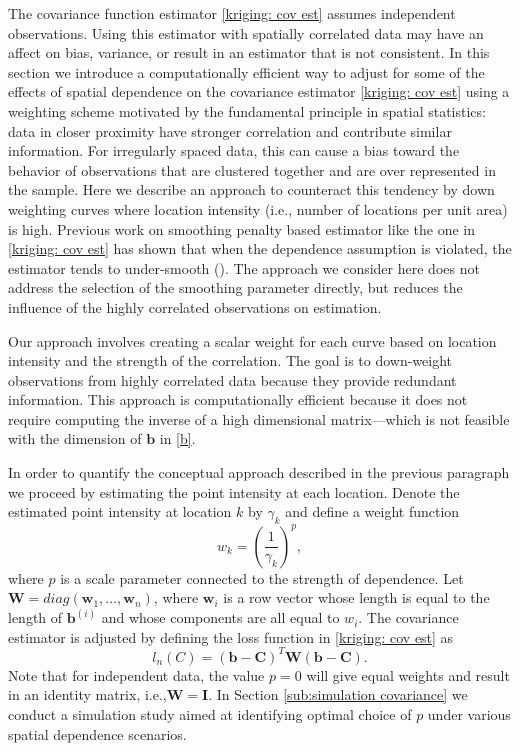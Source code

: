 The covariance function estimator \eqref{kriging: cov est} assumes independent observations. Using this estimator with spatially correlated data may have an affect on bias, variance, or result in an estimator that is not consistent. In this section we introduce a computationally efficient way to adjust for some of the effects of spatial dependence on the covariance estimator \ref{kriging: cov est} using a weighting scheme motivated by the fundamental principle in spatial statistics: data in closer proximity have stronger correlation and contribute similar information. For irregularly spaced data, this can cause a bias toward the behavior of observations that are clustered together and are over represented in the sample. Here we describe an approach to counteract this tendency by down weighting curves where location intensity (i.e., number of locations per unit area) is high. Previous work on smoothing penalty based estimator like the one in \eqref{kriging: cov est} has shown that when the dependence assumption is violated, the estimator tends to under-smooth (\cite{Wang:1998tq}). The approach we consider here does not address the selection of the smoothing parameter directly, but reduces the influence of the highly correlated observations on estimation. 

Our approach involves creating a scalar weight for each curve based on location intensity and the strength of the correlation. The goal is to down-weight observations from highly correlated data because they provide redundant information. This approach is computationally efficient because it does not require computing the inverse of a high dimensional matrix---which is not feasible with the dimension of $\mathbf{b}$ in \eqref{b}.  

In order to quantify the conceptual approach described in the previous paragraph we proceed by estimating the point intensity at each location. Denote the estimated point intensity at location $k$ by $\gamma_k$ and define a weight function 
\begin{equation}
	w_k = \left(\frac{1}{\gamma_k}\right)^p, 
\end{equation}
where $p$ is a scale parameter connected to the strength of dependence.
Let $\mathbf{W}=diag(\mathbf{w}_1, \dots, \mathbf{w}_n)$, where $\mathbf{w}_i$ is a row vector whose length is equal to the length of $\mathbf{b}^{(i)}$ and whose components are all equal to $w_i$. The covariance estimator is adjusted by defining the loss function in \eqref{kriging: cov est} as 
\begin{equation}
	l_{n}(C)= (\mathbf{b} - \mathbf{C})^T\mathbf{W}(\mathbf{b} - \mathbf{C}). \label{eq:diag weighted loss function} 
\end{equation}
Note that for independent data, the value $p = 0$ will give equal weights and result in an identity matrix, i.e.,$\mathbf{W} = \mathbf{I}$. In Section \ref{sub:simulation covariance} we conduct a simulation study aimed at identifying optimal choice of $p$ under various spatial dependence scenarios. 

